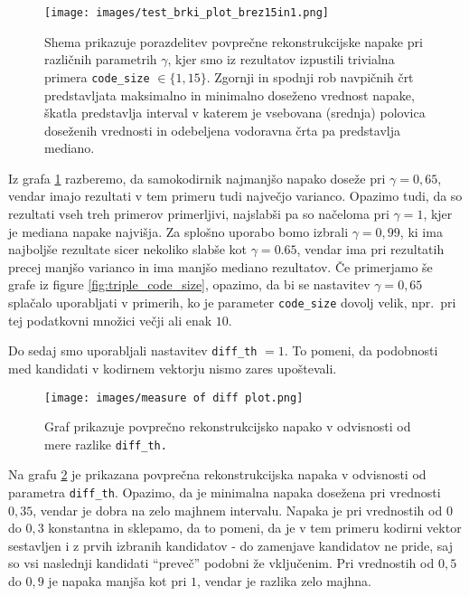 \documentclass[12pt,a4paper,twoside]{article}
\theoremstyle{definition} %
\theoremstyle{plain} %
\numberwithin{equation}{section}  %
\begin{document}
\begin{figure}[h]
	\centering
	\texttt{[image: images/test\_brki\_plot\_brez15in1.png]}
	\caption[Graf z brki.]{Shema prikazuje porazdelitev povprečne rekonstrukcijske napake pri različnih parametrih $\gamma$,
	kjer smo iz rezultatov izpustili trivialna primera \texttt{code\_size} $\in \{1,15\}$.
	Zgornji in spodnji rob navpičnih črt predstavljata maksimalno in minimalno doseženo vrednost napake,
	škatla predstavlja interval v katerem je vsebovana (srednja) polovica doseženih vrednosti
	in odebeljena vodoravna črta pa predstavlja mediano.}
	\label{fig:boxplot}
\end{figure}

Iz grafa \ref{fig:boxplot} razberemo, da samokodirnik najmanjšo napako doseže pri $\gamma=0,65$, vendar imajo rezultati v tem primeru tudi največjo varianco.
Opazimo tudi, da so rezultati vseh treh primerov primerljivi, najslabši pa so načeloma pri $\gamma=1$, kjer je mediana napake najvišja.
Za splošno uporabo bomo izbrali $\gamma=0,99$, ki ima najboljše rezultate sicer nekoliko slabše kot $\gamma=0.65$, 
vendar ima pri rezultatih precej manjšo varianco in ima manjšo mediano rezultatov.
Če primerjamo še grafe iz figure \ref{fig:triple_code_size}, opazimo, da bi se nastavitev $\gamma=0,65$ splačalo uporabljati v primerih, 
ko je parameter \texttt{code\_size} dovolj velik, npr.\ pri tej podatkovni množici večji ali enak $10$.


Do sedaj smo uporabljali nastavitev \texttt{diff\_th} $=1$.
To pomeni, da podobnosti med kandidati v kodirnem vektorju nismo zares upoštevali.
\begin{figure}[h]
	\centering
	\texttt{[image: images/measure of diff plot.png]}
	\caption[Graf napake glede na mero razlike.]{Graf prikazuje povprečno rekonstrukcijsko napako v odvisnosti od mere razlike \texttt{diff\_th.}}
	\label{fig:measure_of_diff}
\end{figure}
Na grafu \ref{fig:measure_of_diff} je prikazana povprečna rekonstrukcijska napaka v odvisnosti od parametra \texttt{diff\_th}.
Opazimo, da je minimalna napaka dosežena pri vrednosti $0,35$, vendar je dobra na zelo majhnem intervalu.
Napaka je pri vrednostih od $0$ do $0,3$ konstantna in sklepamo, da to pomeni, da je v tem primeru kodirni vektor sestavljen i z prvih izbranih kandidatov
- do zamenjave kandidatov ne pride, saj so vsi naslednji kandidati ``preveč'' podobni že vključenim.
Pri vrednostih od $0,5$ do $0,9$ je napaka manjša kot pri $1$, vendar je razlika zelo majhna.
\end{document}
